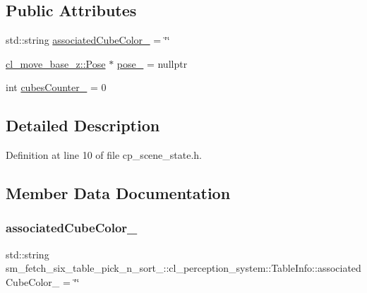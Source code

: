 \subsection*{Public Attributes}
\begin{DoxyCompactItemize}
\item 
std\+::string \hyperlink{structsm__fetch__six__table__pick__n__sort__1_1_1cl__perception__system_1_1TableInfo_add06aa2e093c459887134135a6c831bc}{associated\+Cube\+Color\+\_\+} = \char`\"{}\char`\"{}
\item 
\hyperlink{classcl__move__base__z_1_1Pose}{cl\+\_\+move\+\_\+base\+\_\+z\+::\+Pose} $\ast$ \hyperlink{structsm__fetch__six__table__pick__n__sort__1_1_1cl__perception__system_1_1TableInfo_a3c3947312ded23eeffa46c9049ef60c0}{pose\+\_\+} = nullptr
\item 
int \hyperlink{structsm__fetch__six__table__pick__n__sort__1_1_1cl__perception__system_1_1TableInfo_acda310f040e2946fb6e0666a69ea5e6e}{cubes\+Counter\+\_\+} = 0
\end{DoxyCompactItemize}


\subsection{Detailed Description}


Definition at line 10 of file cp\+\_\+scene\+\_\+state.\+h.



\subsection{Member Data Documentation}
\mbox{\label{structsm__fetch__six__table__pick__n__sort__1_1_1cl__perception__system_1_1TableInfo_add06aa2e093c459887134135a6c831bc}} 
\subsubsection{\texorpdfstring{associated\+Cube\+Color\+\_\+}{associatedCubeColor\_}}
{\footnotesize\ttfamily std\+::string sm\+\_\+fetch\+\_\+six\+\_\+table\+\_\+pick\+\_\+n\+\_\+sort\+\_\+::cl\+\_\+perception\+\_\+system\+::\+Table\+Info\+::associated\+Cube\+Color\+\_\+ = \char`\"{}\char`\"{}}



